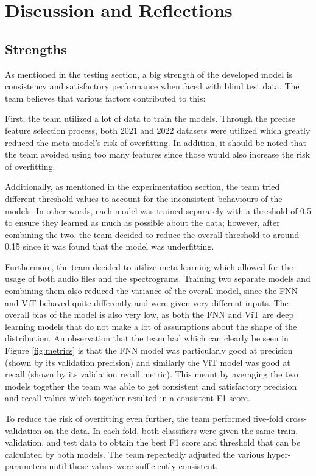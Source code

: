 \documentclass[12pt, conference]{IEEEtran}
\begin{document}
\section{Discussion and Reflections}
\subsection{Strengths}
As mentioned in the testing section, a big strength of the developed model is consistency and satisfactory performance when faced with blind test data. The team believes that various factors contributed to this:

First, the team utilized a lot of data to train the models. Through the precise feature selection process, both 2021 and 2022 datasets were utilized which greatly reduced the meta-model's risk of overfitting. In addition, it should be noted that the team avoided using too many features since those would also increase the risk of overfitting.

Additionally, as mentioned in the experimentation section, the team tried different threshold values to account for the inconsistent behaviours of the models. In other words, each model was trained separately with a threshold of 0.5 to ensure they learned as much as possible about the data; however, after combining the two, the team decided to reduce the overall threshold to around 0.15 since it was found that the model was underfitting.  

Furthermore, the team decided to utilize meta-learning which allowed for the usage of both audio files and the spectrograms. Training two separate models and combining them also reduced the variance of the overall model, since the FNN and ViT behaved quite differently and were given very different inputs. The overall bias of the model is also very low, as both the FNN and ViT are deep learning models that do not make a lot of assumptions about the shape of the distribution. An observation that the team had which can clearly be seen in Figure \ref{fig:metrics} is that the FNN model was particularly good at precision (shown by its validation precision) and similarly the ViT model was good at recall (shown by its validation recall metric). This meant by averaging the two models together the team was able to get consistent and satisfactory precision and recall values which together resulted in a consistent F1-score. 

To reduce the risk of overfitting even further, the team performed five-fold cross-validation on the data. In each fold, both classifiers were given the same train, validation, and test data to obtain the best F1 score and threshold that can be calculated by both models. The team repeatedly adjusted the various hyper-parameters until these values were sufficiently consistent.
\end{document}
